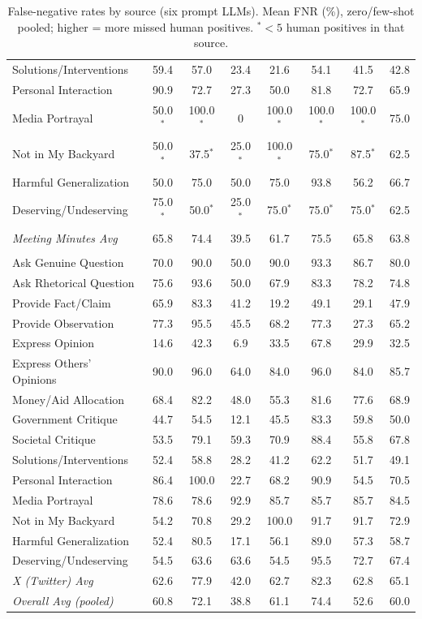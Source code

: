 \begin{table}[htbp]
{\begin{tabular}{lccccccc}
Solutions/Interventions & 59.4 & 57.0 & 23.4 & 21.6 & 54.1 & 41.5 & 42.8 \\
Personal Interaction & 90.9 & 72.7 & 27.3 & 50.0 & 81.8 & 72.7 & 65.9 \\
Media Portrayal & 50.0$^*$ & 100.0$^*$ & 0 & 100.0$^*$ & 100.0$^*$ & 100.0$^*$ & 75.0 \\
Not in My Backyard & 50.0$^*$ & 37.5$^*$ & 25.0$^*$ & 100.0$^*$ & 75.0$^*$ & 87.5$^*$ & 62.5 \\
Harmful Generalization & 50.0 & 75.0 & 50.0 & 75.0 & 93.8 & 56.2 & 66.7 \\
Deserving/Undeserving & 75.0$^*$ & 50.0$^*$ & 25.0$^*$ & 75.0$^*$ & 75.0$^*$ & 75.0$^*$ & 62.5 \\
\midrule
\textit{Meeting Minutes Avg} & 65.8 & 74.4 & 39.5 & 61.7 & 75.5 & 65.8 & 63.8 \\
\addlinespace[0.4em]
\multicolumn{8}{l}{\textit{X (Twitter)}} \\
Ask Genuine Question & 70.0 & 90.0 & 50.0 & 90.0 & 93.3 & 86.7 & 80.0 \\
Ask Rhetorical Question & 75.6 & 93.6 & 50.0 & 67.9 & 83.3 & 78.2 & 74.8 \\
Provide Fact/Claim & 65.9 & 83.3 & 41.2 & 19.2 & 49.1 & 29.1 & 47.9 \\
Provide Observation & 77.3 & 95.5 & 45.5 & 68.2 & 77.3 & 27.3 & 65.2 \\
Express Opinion & 14.6 & 42.3 & 6.9 & 33.5 & 67.8 & 29.9 & 32.5 \\
Express Others' Opinions & 90.0 & 96.0 & 64.0 & 84.0 & 96.0 & 84.0 & 85.7 \\
Money/Aid Allocation & 68.4 & 82.2 & 48.0 & 55.3 & 81.6 & 77.6 & 68.9 \\
Government Critique & 44.7 & 54.5 & 12.1 & 45.5 & 83.3 & 59.8 & 50.0 \\
Societal Critique & 53.5 & 79.1 & 59.3 & 70.9 & 88.4 & 55.8 & 67.8 \\
Solutions/Interventions & 52.4 & 58.8 & 28.2 & 41.2 & 62.2 & 51.7 & 49.1 \\
Personal Interaction & 86.4 & 100.0 & 22.7 & 68.2 & 90.9 & 54.5 & 70.5 \\
Media Portrayal & 78.6 & 78.6 & 92.9 & 85.7 & 85.7 & 85.7 & 84.5 \\
Not in My Backyard & 54.2 & 70.8 & 29.2 & 100.0 & 91.7 & 91.7 & 72.9 \\
Harmful Generalization & 52.4 & 80.5 & 17.1 & 56.1 & 89.0 & 57.3 & 58.7 \\
Deserving/Undeserving & 54.5 & 63.6 & 63.6 & 54.5 & 95.5 & 72.7 & 67.4 \\
\midrule
\textit{X (Twitter) Avg} & 62.6 & 77.9 & 42.0 & 62.7 & 82.3 & 62.8 & 65.1 \\
\midrule
\textit{Overall Avg (pooled)} & 60.8 & 72.1 & 38.8 & 61.1 & 74.4 & 52.6 & 60.0 \\
\bottomrule
\end{tabular}
}
\caption{False-negative rates by source (six prompt LLMs). Mean FNR (\%), zero/few-shot pooled; higher = more missed human positives. {$^*$}${<}5$ human positives in that source.}
\label{tab:underdetection_fnr_by_source}
\end{table}
